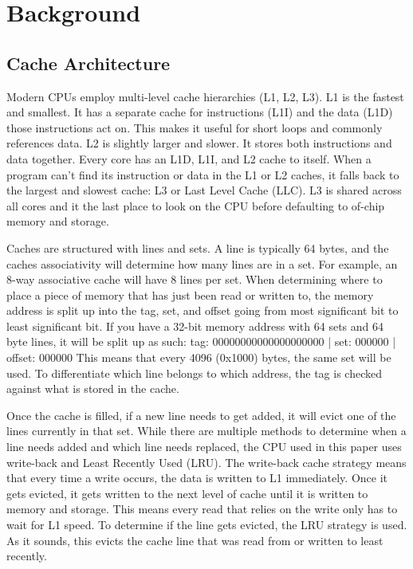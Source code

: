 \documentclass[article]{IEEEtran}
\begin{document}
\section{Background}

\subsection{Cache Architecture}
Modern CPUs employ multi-level cache hierarchies (L1, L2, L3). L1 is the fastest and smallest. It has a separate cache for instructions (L1I) and the data (L1D) those instructions act on. This makes it useful for short loops and commonly references data. L2 is slightly larger and slower. It stores both instructions and data together. Every core has an L1D, L1I, and L2 cache to itself. When a program can't find its instruction or data in the L1 or L2 caches, it falls back to the largest and slowest cache: L3 or Last Level Cache (LLC). L3 is shared across all cores and it the last place to look on the CPU before defaulting to of-chip memory and storage.

Caches are structured with lines and sets. A line is typically 64 bytes, and the caches associativity will determine how many lines are in a set. For example, an 8-way associative cache will have 8 lines per set. When determining where to place a piece of memory that has just been read or written to, the memory address is split up into the tag, set, and offset going from most significant bit to least significant bit. If you have a 32-bit memory address with 64 sets and 64 byte lines, it will be split up as such:
tag: 00000000000000000000 | set: 000000 | offset: 000000
This means that every 4096 (0x1000) bytes, the same set will be used. To differentiate which line belongs to which address, the tag is checked against what is stored in the cache.

Once the cache is filled, if a new line needs to get added, it will evict one of the lines currently in that set. While there are multiple methods to determine when a line needs added and which line needs replaced, the CPU used in this paper uses write-back and Least Recently Used (LRU). The write-back cache strategy means that every time a write occurs, the data is written to L1 immediately. Once it gets evicted, it gets written to the next level of cache until it is written to memory and storage. This means every read that relies on the write only has to wait for L1 speed. To determine if the line gets evicted, the LRU strategy is used. As it sounds, this evicts the cache line that was read from or written to least recently.
\end{document}
